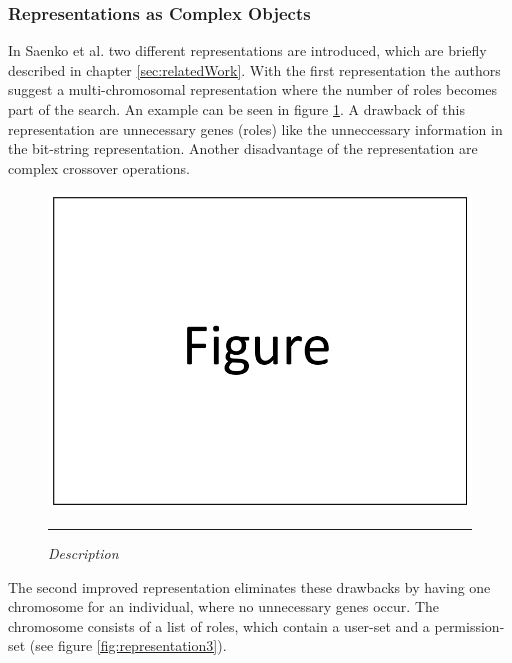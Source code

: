         \subsubsection{Representations as Complex Objects}
        In Saenko et al.\cite{saenko2012design} two different representations are introduced, which are briefly described in chapter \ref{sec:relatedWork}. With the first representation the authors suggest a multi-chromosomal representation where the number of roles becomes part of the search. An example can be seen in figure \ref{fig:representation2}. A drawback of this representation are unnecessary genes (roles) like the unneccessary information in the bit-string representation. Another disadvantage of the representation are complex crossover operations\cite{saenko2012design}.
        \begin{figure}
            \centering
            \includegraphics[scale=0.4]{./Figures/dummy.png}
            \rule{20em}{0.5pt}
            \caption{\textit{Description}}
            \label{fig:representation2}
        \end{figure}
        The second improved representation eliminates these drawbacks by having one chromosome for an individual, where no unnecessary genes occur. The chromosome consists of a list of roles, which contain a user-set and a permission-set (see figure \ref{fig:representation3}).\\
